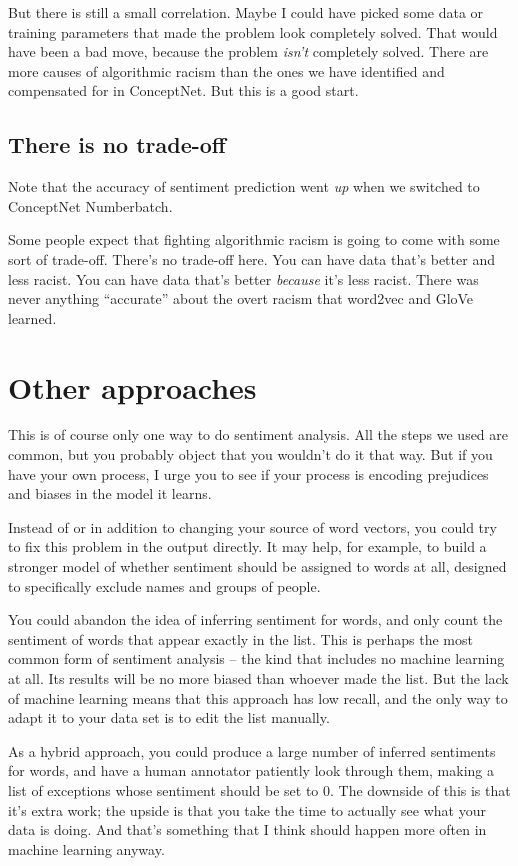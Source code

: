 \documentclass[]{book}
\theoremstyle{definition}
\theoremstyle{definition}
\theoremstyle{definition}
\theoremstyle{remark}
\begin{document}
But there is still a small correlation. Maybe I could have picked some
data or training parameters that made the problem look completely
solved. That would have been a bad move, because the problem
\emph{isn't} completely solved. There are more causes of algorithmic
racism than the ones we have identified and compensated for in
ConceptNet. But this is a good start.

\subsection{There is no trade-off}\label{there-is-no-trade-off}

Note that the accuracy of sentiment prediction went \emph{up} when we
switched to ConceptNet Numberbatch.

Some people expect that fighting algorithmic racism is going to come
with some sort of trade-off. There's no trade-off here. You can have
data that's better and less racist. You can have data that's better
\emph{because} it's less racist. There was never anything ``accurate''
about the overt racism that word2vec and GloVe learned.

\section{Other approaches}\label{other-approaches}

This is of course only one way to do sentiment analysis. All the steps
we used are common, but you probably object that you wouldn't do it that
way. But if you have your own process, I urge you to see if your process
is encoding prejudices and biases in the model it learns.

Instead of or in addition to changing your source of word vectors, you
could try to fix this problem in the output directly. It may help, for
example, to build a stronger model of whether sentiment should be
assigned to words at all, designed to specifically exclude names and
groups of people.

You could abandon the idea of inferring sentiment for words, and only
count the sentiment of words that appear exactly in the list. This is
perhaps the most common form of sentiment analysis -- the kind that
includes no machine learning at all. Its results will be no more biased
than whoever made the list. But the lack of machine learning means that
this approach has low recall, and the only way to adapt it to your data
set is to edit the list manually.

As a hybrid approach, you could produce a large number of inferred
sentiments for words, and have a human annotator patiently look through
them, making a list of exceptions whose sentiment should be set to 0.
The downside of this is that it's extra work; the upside is that you
take the time to actually see what your data is doing. And that's
something that I think should happen more often in machine learning
anyway.


\end{document}
